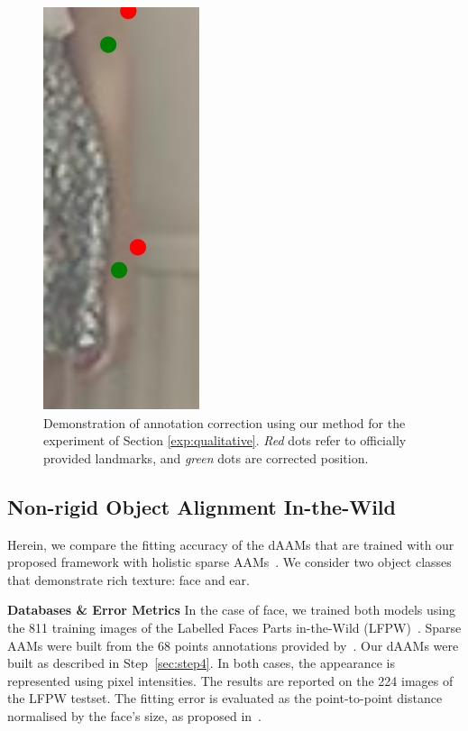 \begin{figure}
    \hfill
    \includegraphics[height=\fh]{resources/Annotation_Correction/Fixing/fix_18}
    \caption{Demonstration of annotation correction using our method for the experiment of Section \ref{exp:qualitative}. \emph{Red} dots refer to officially provided landmarks, and \emph{green} dots are corrected position.}
    \label{fig:qualitative_anno}
\end{figure}

\subsection{Non-rigid Object Alignment In-the-Wild}
\label{exp:daam_benchmark}
Herein, we compare the fitting accuracy of the dAAMs that are trained with our proposed framework with holistic sparse AAMs~\cite{Cootes2001,Matthews2004,antonakos2015feature}. We consider two object classes that demonstrate rich texture: face and ear.

\noindent\textbf{Databases \& Error Metrics} In the case of face, we trained both models using the 811 training images of the Labelled Faces Parts in-the-Wild (LFPW)~\cite{belhumeur2013localizing}. Sparse AAMs were built from the 68 points annotations provided by~\cite{sagonas_iccv_300w_2013,sagonas2016faces}. Our dAAMs were built as described in Step~\ref{sec:step4}. In both cases, the appearance is represented using pixel intensities. The results are reported on the 224 images of the LFPW testset. The fitting error is evaluated as the point-to-point distance normalised by the face's size, as proposed in~\cite{Zhu2012}.

